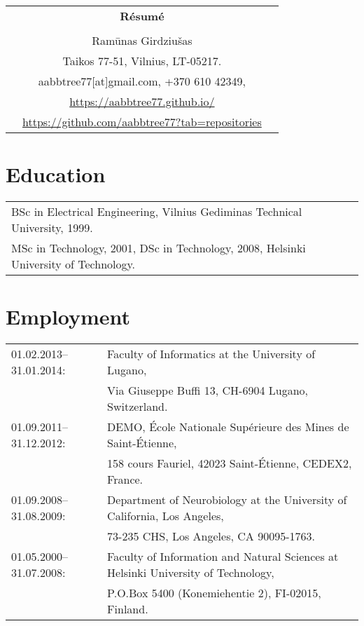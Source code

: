 \documentclass[a4paper,11pt]{article}
\begin{document}
\thispagestyle{empty}

%
%
\begin{center}
\begin{tabular}{ccc}
&\Large \textbf{R\'{e}sum\'{e}}&\\
\\
& Ram\={u}nas Girdziu\v{s}as &\\  
& Taikos 77-51, Vilnius, LT-05217. &\\
& aabbtree77[at]gmail.com, +370 610 42349, &\\
& \url{https://aabbtree77.github.io/}\\
& \url{https://github.com/aabbtree77?tab=repositories}
\end{tabular}
\end{center}
%
\section*{Education}
%
\begin{tabular}{ll}
        BSc in Electrical Engineering, Vilnius Gediminas Technical University, 1999.\\
        MSc in Technology, 2001, DSc in Technology, 2008, Helsinki University of Technology.
\end{tabular}
%
\section*{Employment}
%
\begin{tabular}{ll}
01.02.2013--31.01.2014: & Faculty of Informatics at the University of Lugano,\\
                        & Via Giuseppe Buffi 13, CH-6904 Lugano, Switzerland. 
\\
01.09.2011--31.12.2012: & DEMO, \'{E}cole Nationale Sup\'{e}rieure des Mines de Saint-\'{E}tienne,\\
&158 cours Fauriel, 42023 Saint-\'Etienne, CEDEX2, France.
\\
01.09.2008--31.08.2009: & Department of Neurobiology at the University of California, Los Angeles,\\
&73-235 CHS, Los Angeles, CA 90095-1763.
\\
01.05.2000--31.07.2008: & Faculty of Information and Natural Sciences at Helsinki University of Technology,\\ 
&  P.O.Box 5400 (Konemiehentie 2), FI-02015, Finland.
\end{tabular}
\end{document}

